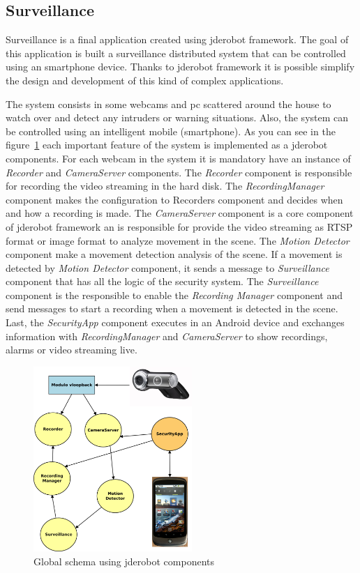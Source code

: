 \documentclass[twocolumn]{svjour3}          %
\begin{document}
\subsection{Surveillance}

Surveillance is a final application created using jderobot
framework. The goal of this application is built a surveillance
distributed system that can be controlled using an smartphone
device. Thanks to jderobot framework it is possible simplify the design
and development of this kind of complex applications.

The system consists in some webcams and pc scattered around the house
to watch over and detect any intruders or warning situations. Also, the
system can be controlled using an intelligent mobile (smartphone). As
you can see in the figure~\ref{fig:surveillance1} each important
feature of the system is implemented as a jderobot components. For each
webcam in the system it is mandatory have an instance of \emph{Recorder} and
\emph{CameraServer} components. The \emph{Recorder} component is
responsible for recording the video streaming in the hard disk. The
\emph{RecordingManager} component makes the configuration to
{Recorders} component and decides when and how a recording is
made. The \emph{CameraServer} component is a core component of
jderobot framework an is responsible for provide the video streaming as
RTSP format or image format to analyze movement in the scene. The \emph{Motion
  Detector} component make a movement detection analysis of the
scene. If a movement is detected by \emph{Motion Detector} component, it
sends a message to \emph{Surveillance} component that has all the logic of
the security system. The \emph{Surveillance} component is the responsible to
enable the \emph{Recording Manager} component and send messages to
start a recording when a movement is detected in the scene. Last, the
\emph{SecurityApp} component executes in an Android device and
exchanges information with \emph{RecordingManager} and
\emph{CameraServer} to show recordings, alarms or video streaming live.

\begin{figure}
\includegraphics[width=6cm]{figs/surveillance-img1.png}
\caption{Global schema using jderobot components}
\label{fig:surveillance1}
\end{figure}
\end{document}
